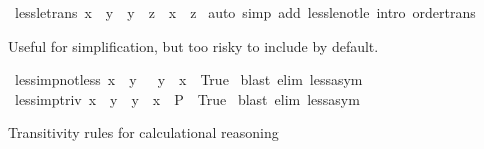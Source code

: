 \begin{isabellebody}
\endisatagproof
{\isafoldproof}%
%
\isadelimproof
\isanewline
%
\endisadelimproof
\isanewline
{}\isamarkupfalse%
\ less{\isacharunderscore}{\kern0pt}le{\isacharunderscore}{\kern0pt}trans{\isacharcolon}{\kern0pt}\ {\isachardoublequoteopen}x\ {\isacharless}{\kern0pt}\ y\ {\isasymLongrightarrow}\ y\ {\isasymle}\ z\ {\isasymLongrightarrow}\ x\ {\isacharless}{\kern0pt}\ z{\isachardoublequoteclose}\isanewline
%
\isadelimproof
%
\endisadelimproof
%
\isatagproof
{}\isamarkupfalse%
\ {\isacharparenleft}{\kern0pt}auto\ simp\ add{\isacharcolon}{\kern0pt}\ less{\isacharunderscore}{\kern0pt}le{\isacharunderscore}{\kern0pt}not{\isacharunderscore}{\kern0pt}le\ intro{\isacharcolon}{\kern0pt}\ order{\isacharunderscore}{\kern0pt}trans{\isacharparenright}{\kern0pt}%
\endisatagproof
{\isafoldproof}%
%
\isadelimproof
%
\endisadelimproof
%
\begin{isamarkuptext}%
Useful for simplification, but too risky to include by default.%
\end{isamarkuptext}\isamarkuptrue%
\isamarkupfalse%
\ less{\isacharunderscore}{\kern0pt}imp{\isacharunderscore}{\kern0pt}not{\isacharunderscore}{\kern0pt}less{\isacharcolon}{\kern0pt}\ {\isachardoublequoteopen}x\ {\isacharless}{\kern0pt}\ y\ {\isasymLongrightarrow}\ {\isacharparenleft}{\kern0pt}{\isasymnot}\ y\ {\isacharless}{\kern0pt}\ x{\isacharparenright}{\kern0pt}\ {\isasymlongleftrightarrow}\ True{\isachardoublequoteclose}\isanewline
%
\isadelimproof
%
\endisadelimproof
%
\isatagproof
{}\isamarkupfalse%
\ {\isacharparenleft}{\kern0pt}blast\ elim{\isacharcolon}{\kern0pt}\ less{\isacharunderscore}{\kern0pt}asym{\isacharparenright}{\kern0pt}%
\endisatagproof
{\isafoldproof}%
%
\isadelimproof
\isanewline
%
\endisadelimproof
\isanewline
{}\isamarkupfalse%
\ less{\isacharunderscore}{\kern0pt}imp{\isacharunderscore}{\kern0pt}triv{\isacharcolon}{\kern0pt}\ {\isachardoublequoteopen}x\ {\isacharless}{\kern0pt}\ y\ {\isasymLongrightarrow}\ {\isacharparenleft}{\kern0pt}y\ {\isacharless}{\kern0pt}\ x\ {\isasymlongrightarrow}\ P{\isacharparenright}{\kern0pt}\ {\isasymlongleftrightarrow}\ True{\isachardoublequoteclose}\isanewline
%
\isadelimproof
%
\endisadelimproof
%
\isatagproof
{}\isamarkupfalse%
\ {\isacharparenleft}{\kern0pt}blast\ elim{\isacharcolon}{\kern0pt}\ less{\isacharunderscore}{\kern0pt}asym{\isacharparenright}{\kern0pt}%
\endisatagproof
{\isafoldproof}%
%
\isadelimproof
%
\endisadelimproof
%
\begin{isamarkuptext}%
Transitivity rules for calculational reasoning%

\end{isamarkuptext}
\end{isabellebody}
